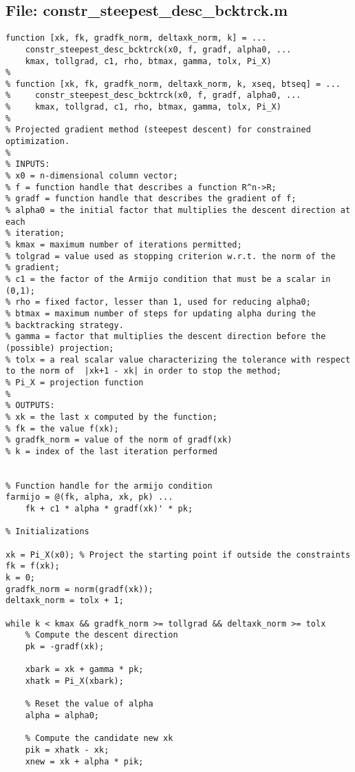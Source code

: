 \documentclass{article}
\begin{document}
\subsection{File: constr\_steepest\_desc\_bcktrck.m}
\begin{verbatim}
function [xk, fk, gradfk_norm, deltaxk_norm, k] = ...
    constr_steepest_desc_bcktrck(x0, f, gradf, alpha0, ...
    kmax, tollgrad, c1, rho, btmax, gamma, tolx, Pi_X)
%
% function [xk, fk, gradfk_norm, deltaxk_norm, k, xseq, btseq] = ...
%     constr_steepest_desc_bcktrck(x0, f, gradf, alpha0, ...
%     kmax, tollgrad, c1, rho, btmax, gamma, tolx, Pi_X)
%
% Projected gradient method (steepest descent) for constrained optimization.
%
% INPUTS:
% x0 = n-dimensional column vector;
% f = function handle that describes a function R^n->R;
% gradf = function handle that describes the gradient of f;
% alpha0 = the initial factor that multiplies the descent direction at each
% iteration;
% kmax = maximum number of iterations permitted;
% tolgrad = value used as stopping criterion w.r.t. the norm of the
% gradient;
% c1 = ﻿the factor of the Armijo condition that must be a scalar in (0,1);
% rho = ﻿fixed factor, lesser than 1, used for reducing alpha0;
% btmax = ﻿maximum number of steps for updating alpha during the 
% backtracking strategy.
% gamma = factor that multiplies the descent direction before the (possible) projection;
% tolx = a real scalar value characterizing the tolerance with respect to the norm of  |xk+1 - xk| in order to stop the method;
% Pi_X = projection function
%
% OUTPUTS:
% xk = the last x computed by the function;
% fk = the value f(xk);
% gradfk_norm = value of the norm of gradf(xk)
% k = index of the last iteration performed


% Function handle for the armijo condition
farmijo = @(fk, alpha, xk, pk) ...
    fk + c1 * alpha * gradf(xk)' * pk;

% Initializations

xk = Pi_X(x0); % Project the starting point if outside the constraints
fk = f(xk);
k = 0;
gradfk_norm = norm(gradf(xk));
deltaxk_norm = tolx + 1;

while k < kmax && gradfk_norm >= tollgrad && deltaxk_norm >= tolx
    % Compute the descent direction
    pk = -gradf(xk);
    
    xbark = xk + gamma * pk;
    xhatk = Pi_X(xbark);    
    
    % Reset the value of alpha
    alpha = alpha0;
    
    % Compute the candidate new xk
    pik = xhatk - xk;
    xnew = xk + alpha * pik;
    

\end{verbatim}
\end{document}

